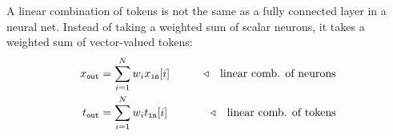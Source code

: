 A linear combination of tokens is not the same as a fully connected layer in a neural net. Instead of taking a weighted sum of scalar neurons, it takes a weighted sum of vector-valued tokens: %
\begin{align}
    x_{\texttt{out}} &= \sum_{i=1}^N w_{i}x_{\texttt{in}}[i] &\quad\quad \triangleleft \quad \text{linear comb. of neurons}\\
    t_{\texttt{out}} &= \sum_{i=1}^N w_{i} t_{\texttt{in}}[i] &\quad\quad \triangleleft \quad \text{linear comb. of tokens} \label{eqn:transformers:lin_comb_tokens}
\end{align}
\vspace{-15pt}
